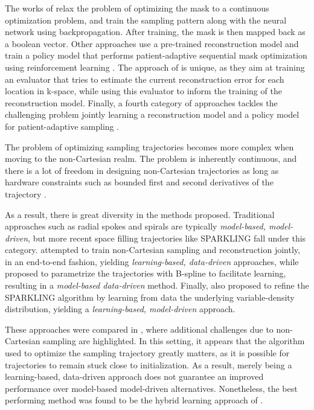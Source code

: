 The works of \citet{bahadir2019learning,aggarwal2020j,weiss2020joint,huijben2020learning} relax the problem of optimizing the mask to a continuous optimization problem, and train the sampling pattern along with the neural network using backpropagation. After training, the mask is then mapped back as a boolean vector. Other approaches use a pre-trained reconstruction model and train a policy model that performs patient-adaptive sequential mask optimization using reinforcement learning \citep{pineda2020active,bakker2020experimental}. The approach of \citet{zhang2019reducing} is unique, as they aim at training an evaluator that tries to estimate the current reconstruction error for each location in k-space, while using this evaluator to inform the training of the reconstruction model. Finally, a fourth category of approaches tackles the challenging problem jointly learning a reconstruction model and a policy model for patient-adaptive sampling \citep{jin2019self,van2021active,yin2021end}.

\begin{remark}
The problem of optimizing sampling trajectories becomes more complex when moving to the non-Cartesian realm. The problem is inherently continuous, and there is a lot of freedom in designing non-Cartesian trajectories as long as hardware constraints such as bounded first and second derivatives of the trajectory \citep{boyer2016generation}. 

As a result, there is great diversity in the methods proposed. Traditional approaches such as radial spokes \citep{lauterbur1973image} and spirals \citep{meyer1992fast} are typically \textit{model-based, model-driven}, but more recent space filling trajectories like SPARKLING \citep{lazarus2019sparkling} fall under this category. \citet{weiss2019pilot,chaithya2022hybrid} attempted to train non-Cartesian sampling and reconstruction jointly, in an end-to-end fashion, yielding \textit{learning-based, data-driven} approaches, while \citet{wang2021b} proposed to parametrize the trajectories with B-spline to facilitate learning, resulting in a \textit{model-based data-driven} method. Finally, \citep{chaithya2021learning} also proposed to refine the SPARKLING algorithm by learning from data the underlying variable-density distribution, yielding a \textit{learning-based, model-driven} approach. 

These approaches were compared in \citet{chaithya2022benchmarking}, where additional challenges due to non-Cartesian sampling are highlighted. In this setting, it appears that the algorithm used to optimize the sampling trajectory greatly matters, as it is possible for trajectories to remain stuck close to initialization. As a result, merely being a learning-based, data-driven approach does not guarantee an improved performance over model-based model-driven alternatives. Nonetheless, the best performing method was found to be the hybrid learning approach of \citet{chaithya2022hybrid}.
\end{remark}

